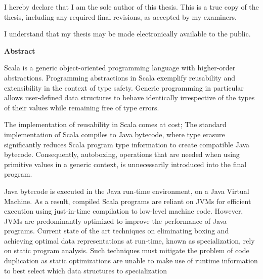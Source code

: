 \cleardoublepage %

  \noindent
I hereby declare that I am the sole author of this thesis. This is a true copy of the thesis, including any required final revisions, as accepted by my examiners.

  \bigskip
  
  \noindent
I understand that my thesis may be made electronically available to the public.

\cleardoublepage


\begin{center}\textbf{Abstract}\end{center}

Scala is a generic object-oriented programming language with higher-order abstractions. 
Programming abstractions in Scala exemplify reusability and extensibility in the context of type safety.
Generic programming in particular allows user-defined data structures to behave identically irrespective of the types of their values while remaining free of type errors.

The implementation of reusability in Scala comes at cost; The standard implementation of Scala compiles to Java bytecode, where type erasure significantly reduces Scala program type information to create compatible Java bytecode.
Consequently, autoboxing, operations that are needed when using primitive values in a generic context, is unnecessarily introduced into the final program. 

Java bytecode is executed in the Java run-time environment, on a Java Virtual Machine. 
As a result, compiled Scala programs are reliant on JVMs for efficient execution using just-in-time compilation to low-level machine code. 
However, JVMs are predominantly optimized to improve the performance of Java programs.  
Current state of the art techniques on eliminating boxing and achieving optimal data representations at run-time, known as specialization, rely on static program analysis.
Such techniques must mitigate the problem of code duplication as static optimizations are unable to make use of runtime information to best select which data structures to specialization

